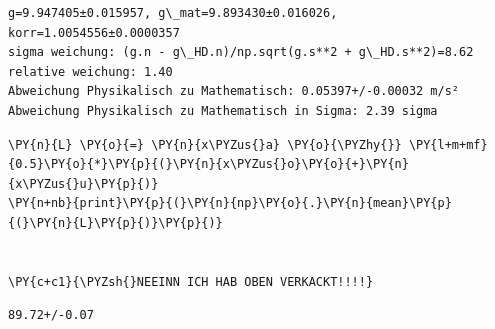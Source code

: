     \begin{Verbatim}[commandchars=\\\{\}]
g=9.947405±0.015957, g\_mat=9.893430±0.016026, korr=1.0054556±0.0000357
sigma weichung: (g.n - g\_HD.n)/np.sqrt(g.s**2 + g\_HD.s**2)=8.62
relative weichung: 1.40
Abweichung Physikalisch zu Mathematisch: 0.05397+/-0.00032 m/s²
Abweichung Physikalisch zu Mathematisch in Sigma: 2.39 sigma
    \end{Verbatim}

    \begin{tcolorbox}[breakable, size=fbox, boxrule=1pt, pad at break*=1mm,colback=cellbackground, colframe=cellborder]
\begin{Verbatim}[commandchars=\\\{\}]
\PY{n}{L} \PY{o}{=} \PY{n}{x\PYZus{}a} \PY{o}{\PYZhy{}} \PY{l+m+mf}{0.5}\PY{o}{*}\PY{p}{(}\PY{n}{x\PYZus{}o}\PY{o}{+}\PY{n}{x\PYZus{}u}\PY{p}{)}
\PY{n+nb}{print}\PY{p}{(}\PY{n}{np}\PY{o}{.}\PY{n}{mean}\PY{p}{(}\PY{n}{L}\PY{p}{)}\PY{p}{)}


\PY{c+c1}{\PYZsh{}NEEINN ICH HAB OBEN VERKACKT!!!!}
\end{Verbatim}
\end{tcolorbox}

    \begin{Verbatim}[commandchars=\\\{\}]
89.72+/-0.07
    \end{Verbatim}

    \begin{tcolorbox}[breakable, size=fbox, boxrule=1pt, pad at break*=1mm,colback=cellbackground, colframe=cellborder]
\begin{Verbatim}[commandchars=\\\{\}]

\end{Verbatim}
\end{tcolorbox}

